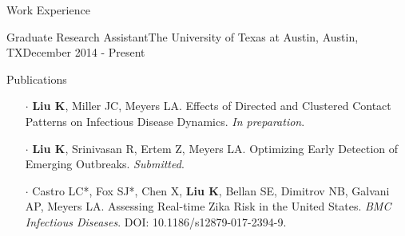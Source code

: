 \documentclass{my_resume} %
\begin{document}
\begin{rSection}{Work Experience}
\begin{rSubsection}{Graduate Research Assistant}{The University of Texas at
    Austin, Austin, TX}{December 2014 - Present}

  \end{rSubsection}
\end{rSection}


\begin{rSection}{Publications}
  \begin{itemize}
    \setlength\itemsep{-1.6em}
    \setlength\leftskip{-1.2em}
    \item[$\cdot$] {\bf Liu K}, Miller JC, Meyers LA. Effects of Directed and Clustered Contact
    Patterns on Infectious Disease Dynamics. {\em In preparation}.\\
    \item[$\cdot$] {\bf Liu K}, Srinivasan R, Ertem Z, Meyers LA. Optimizing Early Detection
    of Emerging Outbreaks. {\em Submitted}.\\
    \item[$\cdot$] Castro LC*, Fox SJ*, Chen X, {\bf Liu K}, Bellan SE, Dimitrov NB, Galvani AP,
    Meyers LA. Assessing Real-time Zika Risk in the United States. {\em BMC
    Infectious Diseases}. DOI: 10.1186/s12879-017-2394-9.
  \end{itemize}
\end{rSection}

\end{document}
